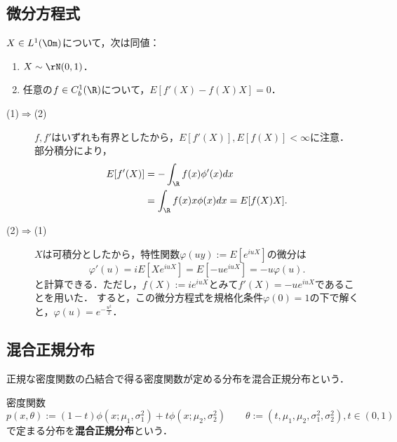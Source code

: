 \documentclass[uplatex,dvipdfmx]{jsreport}
\begin{document}
\subsection{微分方程式}


\begin{lemma}[Steinの補題]
    $X\in L^1(\Om)$について，次は同値：
    \begin{enumerate}
        \item $X\sim\rN(0,1)$．
        \item 任意の$f\in C^1_b(\R)$について，$E[f'(X)-f(X)X]=0$．
    \end{enumerate}
\end{lemma}
\begin{Proof}\mbox{}
    \begin{description}
        \item[(1)$\Rightarrow$(2)] $f,f'$はいずれも有界としたから，$E[f'(X)],E[f(X)]<\infty$に注意．
        部分積分により，
        \begin{align*}
            E[f'(X)]&=-\int_\R f(x)\phi'(x)dx\\
            &=\int_\R f(x)x\phi(x)dx=E[f(X)X].
        \end{align*}
        \item[(2)$\Rightarrow$(1)] $X$は可積分としたから，特性関数$\varphi(uy):=E[e^{iuX}]$の微分は
        \[\varphi'(u)=iE[Xe^{iuX}]=E[-ue^{iuX}]=-u\varphi(u).\]
        と計算できる．ただし，$f(X):=ie^{iuX}$とみて$f'(X)=-ue^{iuX}$であることを用いた．
        すると，この微分方程式を規格化条件$\varphi(0)=1$の下で解くと，$\varphi(u)=e^{-\frac{u^2}{2}}$．
    \end{description}
\end{Proof}

\subsection{混合正規分布}

\begin{tcolorbox}[colframe=ForestGreen, colback=ForestGreen!10!white,breakable,colbacktitle=ForestGreen!40!white,coltitle=black,fonttitle=\bfseries\sffamily,
title=]
    正規な密度関数の凸結合で得る密度関数が定める分布を混合正規分布という．
\end{tcolorbox}

\begin{definition}
    密度関数
    \[p(x,\theta):=(1-t)\phi(x;\mu_1,\sigma_1^2)+t\phi(x;\mu_2,\sigma_2^2)\qquad\theta:=(t,\mu_1,\mu_2,\sigma_1^2,\sigma_2^2),t\in(0,1)\]
    で定まる分布を\textbf{混合正規分布}という．
\end{definition}
\end{document}
